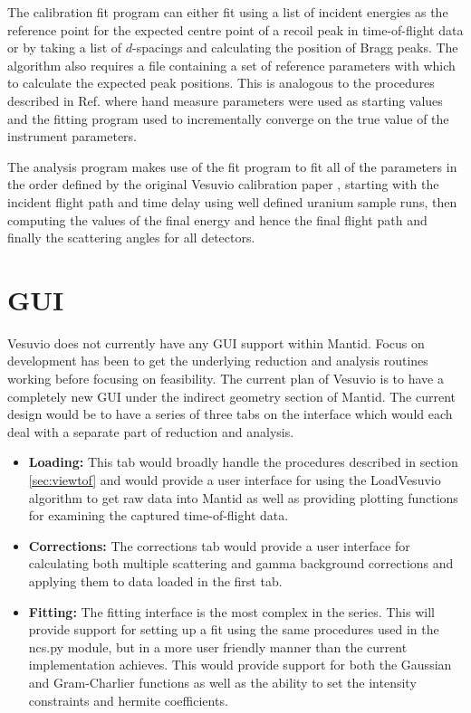 \documentclass[paper=a4, fontsize=11pt]{scrartcl}	%
\numberwithin{equation}{section}															%
\numberwithin{figure}{section}																%
\numberwithin{table}{section}
\begin{document}
The calibration fit program can either fit using a list of incident energies as the reference point for the expected centre point of a recoil peak in time-of-flight data or by taking a list of $d$-spacings and calculating the position of Bragg peaks. The algorithm also requires a file containing a set of reference parameters with which to calculate the expected peak positions. This is analogous to the procedures described in Ref. \cite{mayers2011calibration} where hand measure parameters were used as starting values and the fitting program used to incrementally converge on the true value of the instrument parameters.

The analysis program makes use of the fit program to fit all of the parameters in the order defined by the original Vesuvio calibration paper \cite{mayers2011calibration}, starting with the incident flight path and time delay using well defined uranium sample runs, then computing the values of the final energy and hence the final flight path and finally the scattering angles for all detectors.

\section{GUI}
\label{sec:GUI}
Vesuvio does not currently have any GUI support within Mantid. Focus on development has been to get the underlying reduction and analysis routines working before focusing on feasibility. The current plan of Vesuvio is to have a completely new GUI under the indirect geometry section of Mantid. The current design would be to have a series of three tabs on the interface which would each deal with a separate part of reduction and analysis.

\begin{itemize}
\item \textbf{Loading:} This tab would broadly handle the procedures described in section \ref{sec:viewtof} and would provide a user interface for using the LoadVesuvio algorithm to get raw data into Mantid as well as providing plotting functions for examining the captured time-of-flight data.

\item \textbf{Corrections:} The corrections tab would provide a user interface for calculating both multiple scattering and gamma background corrections and applying them to data loaded in the first tab.

\item \textbf{Fitting:} The fitting interface is the most complex in the series. This will provide support for setting up a fit using the same procedures used in the ncs.py module, but in a more user friendly manner than the current implementation achieves. This would provide support for both the Gaussian and Gram-Charlier functions as well as the ability to set the intensity constraints and hermite coefficients.
\end{itemize}
\end{document}
